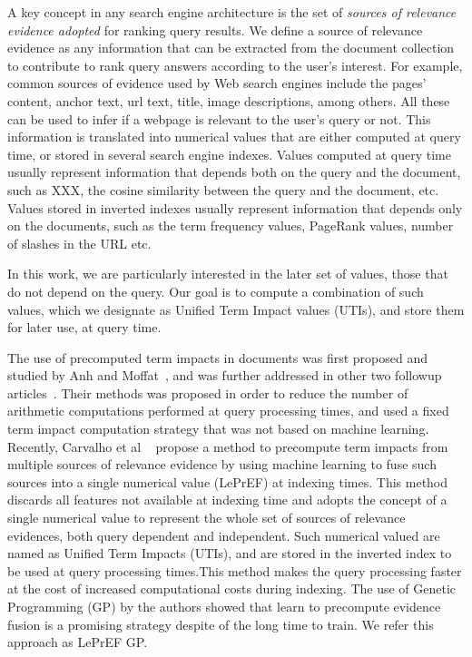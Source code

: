 \documentclass[preprint,12pt,3p]{elsarticle}
\begin{document}
A key concept in any search engine architecture is the set of \emph{sources of relevance evidence adopted} for ranking query results. We define a source of relevance evidence as any information that can be extracted from the document collection to contribute to rank query answers according to the user's interest. For example, common sources of evidence used by Web search engines include the pages' content, anchor text, url text, title, image descriptions, among others. All these can be used to infer if a webpage is relevant to the user's query or not. This information is translated into numerical values that are either computed at query time, or stored in several search engine indexes. Values computed at query time usually represent information that depends both on the query and the document, such as XXX, the cosine similarity between the query and the document, etc. Values stored in inverted indexes usually represent information that depends only on the documents, such as the term frequency values, PageRank values, number of slashes in the URL etc.

In this work, we are particularly interested in the later set of values, those that do not depend on the query. Our goal is to compute a combination of such values, which we designate as Unified Term Impact values (UTIs), and store them for later use, at query time.

The use of precomputed term impacts in documents was first proposed and studied by Anh and Moffat~\cite{Anh:2002:ITE:564376.564380}, and was further addressed in other two followup articles~\cite{Anh:2005:SSS:1076034.1076075,anh2008term}. Their methods was proposed in order to reduce the number of arithmetic computations performed at query processing times, and used a fixed term impact computation strategy that was not based on machine learning. Recently, Carvalho et al ~\cite{costa2012lepref} propose a method to  precompute term impacts from multiple sources of relevance evidence by using machine learning to fuse such sources into a single numerical value (LePrEF) at indexing times. This method discards all features not available at indexing time and adopts the concept of a single numerical value to represent the whole set of sources of relevance evidences, both query dependent and independent. Such numerical valued are named as Unified Term Impacts (UTIs), and are stored  in the inverted index to be used at query processing times.This method makes the query processing faster at the cost of increased computational costs during indexing. The use of Genetic Programming (GP) by the authors showed that learn to precompute evidence fusion is a promising strategy despite of the long time to train. We refer this approach as LePrEF GP. 
\end{document}

